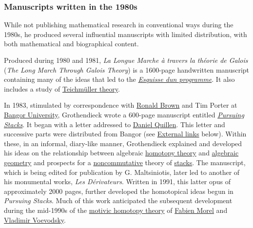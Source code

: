 \subsubsection{Manuscripts written in the 1980s}\label{Manuscripts_written_in_the_1980s}

While not publishing mathematical research in conventional ways during the 1980s, he produced several influential manuscripts with limited distribution, with both mathematical and biographical content.

Produced during 1980 and 1981, \emph{La Longue Marche à travers la théorie de Galois} (\emph{The Long March Through Galois Theory}) is a 1600-page handwritten manuscript containing many of the ideas that led to the \emph{\href{https://en.wikipedia.org/wiki/Esquisse_d'un_programme}{Esquisse d\textquotesingle un programme}}. It also includes a study of \href{https://en.wikipedia.org/wiki/Teichmüller_space}{Teichmüller theory}.

In 1983, stimulated by correspondence with \href{https://en.wikipedia.org/wiki/Ronald_Brown_(mathematician)}{Ronald Brown} and Tim Porter at \href{https://en.wikipedia.org/wiki/Bangor_University}{Bangor University}, Grothendieck wrote a 600-page manuscript entitled \emph{\href{https://en.wikipedia.org/wiki/Pursuing_Stacks}{Pursuing Stacks}}. It began with a letter addressed to \href{https://en.wikipedia.org/wiki/Daniel_Quillen}{Daniel Quillen}. This letter and successive parts were distributed from Bangor (see \href{https://en.wikipedia.org/wiki/Alexander_Grothendieck\#External_links}{External links} below). Within these, in an informal, diary-like manner, Grothendieck explained and developed his ideas on the relationship between algebraic \href{https://en.wikipedia.org/wiki/Homotopy_theory}{homotopy theory} and \href{https://en.wikipedia.org/wiki/Algebraic_geometry}{algebraic geometry} and prospects for a \href{https://en.wikipedia.org/wiki/Noncommutative}{noncommutative} theory of \href{https://en.wikipedia.org/wiki/Stack_(mathematics)}{stacks}. The manuscript, which is being edited for publication by G. Maltsiniotis, later led to another of his monumental works, \emph{Les Dérivateurs}. Written in 1991, this latter opus of approximately 2000 pages, further developed the homotopical ideas begun in \emph{Pursuing Stacks}. Much of this work anticipated the subsequent development during the mid-1990s of the \href{https://en.wikipedia.org/wiki/A¹_homotopy_theory}{motivic homotopy theory} of \href{https://en.wikipedia.org/wiki/Fabien_Morel}{Fabien Morel} and \href{https://en.wikipedia.org/wiki/Vladimir_Voevodsky}{Vladimir Voevodsky}.

